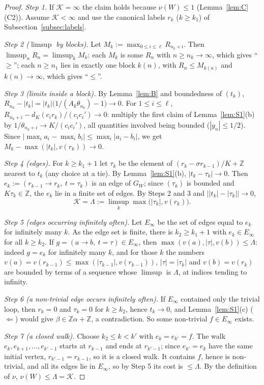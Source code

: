 \documentclass[11pt]{amsart}
\theoremstyle{definition}
\theoremstyle{remark}
\newcommand{\Z}{\mathbb{Z}}
\newcommand{\KL}{\mathcal{K}}
\begin{document}
\begin{proof}
\emph{Step 1.} If $\KL=\infty$ the claim holds because $\nu(W)\le1$ (Lemma~\ref{lem:C}(C2)). Assume $\KL<\infty$ and use
the canonical labels $r_k$ ($k\ge k_1$) of Subsection~\ref{subsec:labels}.

\emph{Step 2 ($\limsup$ by blocks).} Let $M_k:=\max_{0\le i\le\ell}R_{n_k+i}$. Then $\limsup_nR_n=\limsup_kM_k$: each
$M_k$ is some $R_n$ with $n\ge n_k\to\infty$, which gives ``$\ge$''; each $n\ge n_1$ lies in exactly one block $k(n)$, with
$R_n\le M_{k(n)}$ and $k(n)\to\infty$, which gives ``$\le$''.

\emph{Step 3 (limits inside a block).} By Lemma~\ref{lem:B} and boundedness of $(t_k)$,
$R_{n_k}-|t_k|=|t_k|\bigl(1/(A_k\theta_{n_k})-1\bigr)\to0$. For $1\le i\le\ell$,
$R_{n_k+i}-d_K(c_ir_k)/(c_ic_i')\to0$: multiply the first claim of Lemma~\ref{lem:S1}(b) by
$1/\theta_{n_k+i}\to K/(c_ic_i')$, all quantities involved being bounded ($|y_n|\le1/2$). Since
$|\max_ia_i-\max_ib_i|\le\max_i|a_i-b_i|$, we get $M_k-\max(|t_k|,v(r_k))\to0$.

\emph{Step 4 (edges).} For $k\ge k_1+1$ let $\tau_k$ be the element of $(r_k-\sigma r_{k-1})/K+\Z$ nearest to $t_k$ (any
choice at a tie). By Lemma~\ref{lem:S1}(b), $|t_k-\tau_k|\to0$. Then $e_k:=(r_{k-1}\to r_k,\ t=\tau_k)$ is an edge of
$G_W$; since $(\tau_k)$ is bounded and $K\tau_k\in\Z$, the $e_k$ lie in a finite set of edges. By Steps 2 and 3 and
$\bigl||t_k|-|\tau_k|\bigr|\to0$,
\[
\KL=\Lambda:=\limsup_k\max\bigl(|\tau_k|,v(r_k)\bigr).
\]

\emph{Step 5 (edges occurring infinitely often).} Let $E_\infty$ be the set of edges equal to $e_k$ for infinitely many
$k$. As the edge set is finite, there is $k_2\ge k_1+1$ with $e_k\in E_\infty$ for all $k\ge k_2$. If
$g=(a\to b,\ t=\tau)\in E_\infty$, then $\max(v(a),|\tau|,v(b))\le\Lambda$: indeed $g=e_k$ for infinitely many $k$, and
for those $k$ the numbers $v(a)=v(r_{k-1})\le\max(|\tau_{k-1}|,v(r_{k-1}))$, $|\tau|=|\tau_k|$ and $v(b)=v(r_k)$ are
bounded by terms of a sequence whose $\limsup$ is $\Lambda$, at indices tending to infinity.

\emph{Step 6 (a non-trivial edge occurs infinitely often).} If $E_\infty$ contained only the trivial loop, then
$r_k=0$ and $\tau_k=0$ for $k\ge k_2$, hence $t_k\to0$, and Lemma~\ref{lem:S1}(c) ($\Leftarrow$) would give
$\beta\in\Z\alpha+\Z$, a contradiction. So some non-trivial $f\in E_\infty$ exists.

\emph{Step 7 (a closed walk).} Choose $k_2\le k<k'$ with $e_k=e_{k'}=f$. The walk $e_k,e_{k+1},\dots,e_{k'-1}$ starts at
$r_{k-1}$ and ends at $r_{k'-1}$; since $e_{k'}=e_k$ have the same initial vertex, $r_{k'-1}=r_{k-1}$, so it is a closed
walk. It contains $f$, hence is non-trivial, and all its edges lie in $E_\infty$, so by Step 5 its cost is
$\le\Lambda$. By the definition of $\nu$, $\nu(W)\le\Lambda=\KL$.
\end{proof}
\end{document}

